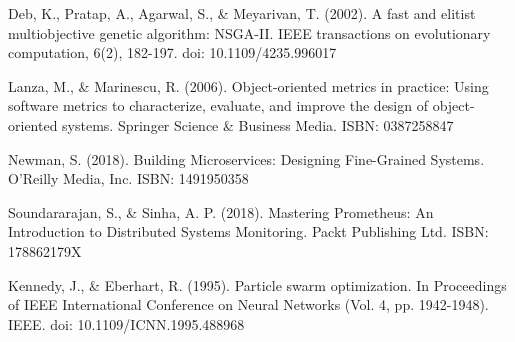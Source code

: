 Deb, K., Pratap, A., Agarwal, S., & Meyarivan, T. (2002). A fast and elitist multiobjective genetic algorithm: NSGA-II. IEEE transactions on evolutionary computation, 6(2), 182-197. doi: 10.1109/4235.996017

Lanza, M., & Marinescu, R. (2006). Object-oriented metrics in practice: Using software metrics to characterize, evaluate, and improve the design of object-oriented systems. Springer Science & Business Media. ISBN: 0387258847

Newman, S. (2018). Building Microservices: Designing Fine-Grained Systems. O'Reilly Media, Inc. ISBN: 1491950358

Soundararajan, S., & Sinha, A. P. (2018). Mastering Prometheus: An Introduction to Distributed Systems Monitoring. Packt Publishing Ltd. ISBN: 178862179X

Kennedy, J., & Eberhart, R. (1995). Particle swarm optimization. In Proceedings of IEEE International Conference on Neural Networks (Vol. 4, pp. 1942-1948). IEEE. doi: 10.1109/ICNN.1995.488968